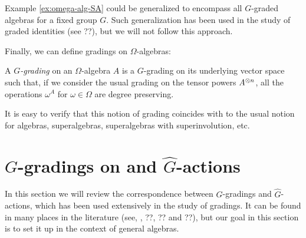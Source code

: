 \begin{remark}
    Example \ref{ex:omega-alg-SA} could be generalized to encompass all $G$-graded algebras for a fixed group $G$. 
    Such generalization has been used in the study of graded identities (see ??), but we will not follow this approach.
\end{remark}

Finally, we can define gradings on $\Omega$-algebras:

\begin{defi}\label{def:grds-on-Omega-algebras}
    A \emph{$G$-grading} on an $\Omega$-algebra $A$ is a $G$-grading on its underlying vector space such that, if we consider the usual grading on the tensor powers $A^{\otimes n}$, all the operations $\omega^A$ for $\omega \in \Omega$ are degree preserving.
\end{defi}

It is easy to verify that this notion of grading coincides with to the usual notion for algebras, superalgebras, superalgebras with superinvolution, etc.



\section{$G$-gradings on  and $\widehat G$-actions}\label{sec:g-hat-action}

In this section we will review the correspondence between $G$-gradings and $\widehat G$-actions, which has been used extensively in the study of gradings. 
It can be found in many places in the literature (see, \eg, ??, ?? and ??), but our goal in this section is to set it up in the context of general algebras. 

